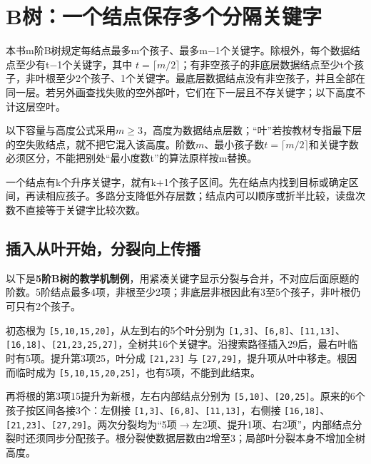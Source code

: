 \section{B树：一个结点保存多个分隔关键字}\label{DS07-07}

本书m阶B树规定每结点最多m个孩子、最多m\ensuremath{-}1个关键字。除根外，每个数据结点至少有t\ensuremath{-}1个关键字，其中 \(t=\lceil m/2\rceil\)；有非空孩子的非底层数据结点至少t个孩子，非叶根至少2个孩子、1个关键字。最底层数据结点没有非空孩子，并且全部在同一层。若另外画查找失败的空外部叶，它们在下一层且不存关键字；以下高度不计这层空叶。

以下容量与高度公式采用\(m\ge3\)，高度为数据结点层数；``叶''若按教材专指最下层的空失败结点，就不把它混入该高度。阶数\(m\)、最小孩子数\(t=\lceil m/2\rceil\)和关键字数必须区分，不能把别处``最小度数t''的算法原样按m替换。

一个结点有k个升序关键字，就有k+1个孩子区间。先在结点内找到目标或确定区间，再读相应孩子。多路分支降低外存层数；结点内可以顺序或折半比较，读盘次数不直接等于关键字比较次数。

\subsection{插入从叶开始，分裂向上传播}\label{ux63d2ux5165ux4eceux53f6ux5f00ux59cbux5206ux88c2ux5411ux4e0aux4f20ux64ad}

以下是\textbf{5阶B树的教学机制例}，用紧凑关键字显示分裂与合并，不对应后面原题的阶数。5阶结点最多4项，非根至少2项；非底层非根因此有3至5个孩子，非叶根仍可只有2个孩子。

初态根为 \texttt{[\allowbreak{}5,\allowbreak{}10,\allowbreak{}15,\allowbreak{}20]\allowbreak{}}，从左到右的5个叶分别为 \texttt{[\allowbreak{}1,\allowbreak{}3]\allowbreak{}}、\texttt{[\allowbreak{}6,\allowbreak{}8]\allowbreak{}}、\texttt{[\allowbreak{}11,\allowbreak{}13]\allowbreak{}}、\texttt{[\allowbreak{}16,\allowbreak{}18]\allowbreak{}}、\texttt{[\allowbreak{}21,\allowbreak{}23,\allowbreak{}25,\allowbreak{}27]\allowbreak{}}，全树共16个关键字。沿搜索路径插入29后，最右叶临时有5项。提升第3项25，叶分成 \texttt{[\allowbreak{}21,\allowbreak{}23]\allowbreak{}} 与 \texttt{[\allowbreak{}27,\allowbreak{}29]\allowbreak{}}，提升项从叶中移走。根因而临时成为 \texttt{[\allowbreak{}5,\allowbreak{}10,\allowbreak{}15,\allowbreak{}20,\allowbreak{}25]\allowbreak{}}，也有5项，不能到此结束。

再将根的第3项15提升为新根，左右内部结点分别为 \texttt{[\allowbreak{}5,\allowbreak{}10]\allowbreak{}}、\texttt{[\allowbreak{}20,\allowbreak{}25]\allowbreak{}}。原来的6个孩子按区间各接3个：左侧接 \texttt{[\allowbreak{}1,\allowbreak{}3]\allowbreak{}}、\texttt{[\allowbreak{}6,\allowbreak{}8]\allowbreak{}}、\texttt{[\allowbreak{}11,\allowbreak{}13]\allowbreak{}}，右侧接 \texttt{[\allowbreak{}16,\allowbreak{}18]\allowbreak{}}、\texttt{[\allowbreak{}21,\allowbreak{}23]\allowbreak{}}、\texttt{[\allowbreak{}27,\allowbreak{}29]\allowbreak{}}。两次分裂均为“5项\ensuremath{\to}左2项、提升1项、右2项”，内部结点分裂时还须同步分配孩子。根分裂使数据层数由2增至3；局部叶分裂本身不增加全树高度。

